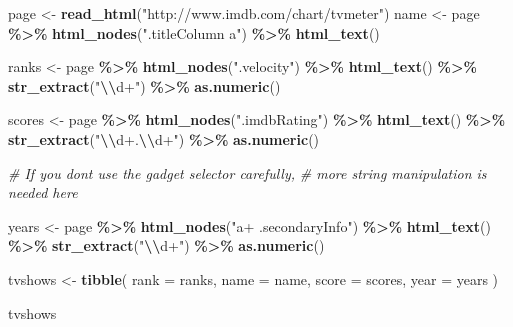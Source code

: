 \documentclass[
]{book}
\newenvironment{Shaded}{\begin{snugshade}}{\end{snugshade}}
\newcommand{\AttributeTok}[1]{\textcolor[rgb]{0.13,0.29,0.53}{#1}}
\newcommand{\CommentTok}[1]{\textcolor[rgb]{0.56,0.35,0.01}{\textit{#1}}}
\newcommand{\FunctionTok}[1]{\textcolor[rgb]{0.13,0.29,0.53}{\textbf{#1}}}
\newcommand{\NormalTok}[1]{#1}
\newcommand{\OtherTok}[1]{\textcolor[rgb]{0.56,0.35,0.01}{#1}}
\newcommand{\SpecialCharTok}[1]{\textcolor[rgb]{0.81,0.36,0.00}{\textbf{#1}}}
\newcommand{\StringTok}[1]{\textcolor[rgb]{0.31,0.60,0.02}{#1}}
\begin{document}
\begin{Shaded}
\begin{Highlighting}[]
\NormalTok{page }\OtherTok{\textless{}{-}} \FunctionTok{read\_html}\NormalTok{(}\StringTok{"http://www.imdb.com/chart/tvmeter"}\NormalTok{)}
\NormalTok{name }\OtherTok{\textless{}{-}}\NormalTok{ page }\SpecialCharTok{\%\textgreater{}\%}
  \FunctionTok{html\_nodes}\NormalTok{(}\StringTok{".titleColumn a"}\NormalTok{) }\SpecialCharTok{\%\textgreater{}\%}
  \FunctionTok{html\_text}\NormalTok{()}

\NormalTok{ranks }\OtherTok{\textless{}{-}}\NormalTok{ page }\SpecialCharTok{\%\textgreater{}\%}
  \FunctionTok{html\_nodes}\NormalTok{(}\StringTok{".velocity"}\NormalTok{) }\SpecialCharTok{\%\textgreater{}\%}
  \FunctionTok{html\_text}\NormalTok{() }\SpecialCharTok{\%\textgreater{}\%}
  \FunctionTok{str\_extract}\NormalTok{(}\StringTok{"}\SpecialCharTok{\textbackslash{}\textbackslash{}}\StringTok{d+"}\NormalTok{) }\SpecialCharTok{\%\textgreater{}\%}
  \FunctionTok{as.numeric}\NormalTok{()}

\NormalTok{scores }\OtherTok{\textless{}{-}}\NormalTok{  page }\SpecialCharTok{\%\textgreater{}\%}
  \FunctionTok{html\_nodes}\NormalTok{(}\StringTok{".imdbRating"}\NormalTok{) }\SpecialCharTok{\%\textgreater{}\%}
  \FunctionTok{html\_text}\NormalTok{() }\SpecialCharTok{\%\textgreater{}\%}
  \FunctionTok{str\_extract}\NormalTok{(}\StringTok{"}\SpecialCharTok{\textbackslash{}\textbackslash{}}\StringTok{d+.}\SpecialCharTok{\textbackslash{}\textbackslash{}}\StringTok{d+"}\NormalTok{) }\SpecialCharTok{\%\textgreater{}\%}
  \FunctionTok{as.numeric}\NormalTok{()}

\CommentTok{\# If you don\textquotesingle{}t use the gadget selector carefully, }
\CommentTok{\# more string manipulation is needed here}

\NormalTok{years }\OtherTok{\textless{}{-}}\NormalTok{ page }\SpecialCharTok{\%\textgreater{}\%}
  \FunctionTok{html\_nodes}\NormalTok{(}\StringTok{"a+ .secondaryInfo"}\NormalTok{) }\SpecialCharTok{\%\textgreater{}\%}
  \FunctionTok{html\_text}\NormalTok{() }\SpecialCharTok{\%\textgreater{}\%}
  \FunctionTok{str\_extract}\NormalTok{(}\StringTok{"}\SpecialCharTok{\textbackslash{}\textbackslash{}}\StringTok{d+"}\NormalTok{) }\SpecialCharTok{\%\textgreater{}\%}
  \FunctionTok{as.numeric}\NormalTok{()}
\end{Highlighting}
\end{Shaded}

\begin{Shaded}
\begin{Highlighting}[]
\NormalTok{tvshows }\OtherTok{\textless{}{-}} \FunctionTok{tibble}\NormalTok{(}
  \AttributeTok{rank =}\NormalTok{ ranks,}
  \AttributeTok{name =}\NormalTok{ name,}
  \AttributeTok{score =}\NormalTok{ scores,}
  \AttributeTok{year =}\NormalTok{ years}
\NormalTok{)}

\NormalTok{tvshows}
\end{Highlighting}
\end{Shaded}
\end{document}
